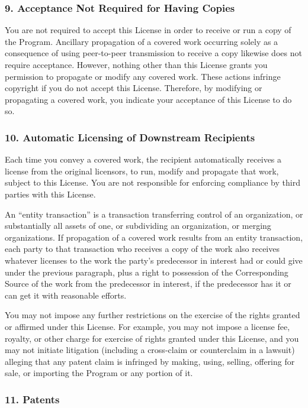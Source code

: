 \documentclass[a4paper, 11pt, twoside]{article}
\begin{document}
\subsubsection{9. Acceptance Not Required for Having Copies}

You are not required to accept this License in order to receive or run a copy of the Program. Ancillary propagation of a covered work occurring solely as a consequence of using peer-to-peer transmission to receive a copy likewise does not require acceptance. However, nothing other than this License grants you permission to propagate or modify any covered work. These actions infringe copyright if you do not accept this License. Therefore, by modifying or propagating a covered work, you indicate your acceptance of this License to do
so.

\subsubsection{10. Automatic Licensing of Downstream Recipients}

Each time you convey a covered work, the recipient automatically receives a license from the original licensors, to run, modify and propagate that work, subject to this License. You are not responsible for enforcing compliance by third parties with this License.

An “entity transaction” is a transaction transferring control of an organization, or substantially all assets of one, or subdividing an organization, or merging organizations. If propagation of a covered work results from an entity transaction, each party to that transaction who receives a copy of the work also receives whatever licenses to the work the party's predecessor in interest had or could give under the previous paragraph, plus a right to possession of the Corresponding Source of the work from the predecessor in interest, if the predecessor has it or can get it with reasonable efforts.

You may not impose any further restrictions on the exercise of the rights granted or affirmed under this License. For example, you may not impose a license fee, royalty, or other charge for exercise of rights granted under this License, and you may not initiate litigation (including a cross-claim or counterclaim in a lawsuit) alleging that any patent claim is infringed by making, using, selling, offering for sale, or importing the Program or any portion of it.

\subsubsection{11. Patents}
\end{document}
